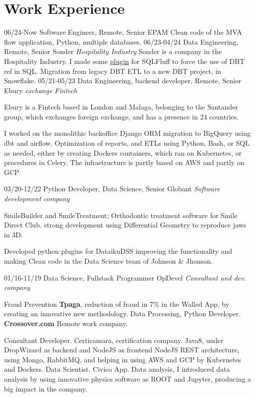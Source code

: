 \section{Work Experience}

\begin{entrylist}
  \entry
    {06/24-Now}
    {Software Engineer, Remote, Senior}
    {EPAM}
    {Clean code of the MVA flow application, Python, multiple databases.}
  \entry
    {06/23-04/24}
    {Data Engineering, Remote, Senior}
    {Sonder {\sl Hospitality Industry}}
	{Sonder is a company in the Hospitality Industry. I made some \href{http:\\https://github.com/juanfejara/sqlfluff-templ-check}{plugin} for SQLFluff to
     force the use of DBT ref in SQL. Migration from legacy DBT ETL to a new DBT project, in Snowflake.}
  \entry
    {05/21-05/23}
    {Data Engineering, backend developer, Remote, Senior}
    {Ebury {\sl exchange Fintech}}
    {Ebury is a Fintech based in London and Malaga, belonging to the Santander group, which exchanges
foreign exchange, and has a presence in 24 countries.

I worked on the monolithic backoffice Django ORM migration to BigQuery using dbt and airflow. Optimization of reports, and ETLs using Python, Bash, or SQL as needed, either by creating Dockers containers, which ran on Kubernetes, or procedures in Celery.
The infrastructure is partly based on AWS and partly on GCP.}
  \entry
    {03/20-12/22}
    {Python Developer, Data Science, Senior}
    {Globant {\sl Software development company}}
    {SmileBuilder and SmileTreatment; Orthodontic treatment software for Smile Direct Club. strong development using Differential Geometry to reproduce jaws in 3D.

Developed python plugins for DataikuDSS improving the functionality and making Clean code in the Data Science team of Johnson \& Jhonson.}

  \entry
    {01/16-11/19}
    {Data Science, Fullstack Programmer}
    {OpDevel {\sl Consultant and dev. company}}
    {Fraud Prevention \textbf{Tpaga}, reduction of fraud in 7\% in the Walled App, by creating an innovative new methodology. Data Processing, Python Developer. \textbf{Crossover.com} Remote work company.

Consultant Developer. Certicamara, certification company. Java8, under DropWizard as backend and NodeJS as frontend NodeJS REST architecture, using Mongo, RabbitMQ, and helping in using AWS and GCP by Kubernetes and Dockers. Data Scientist. Civico App. Data analysis, I introduced data analysis by using innovative physics software as ROOT and Jupyter, producing a big impact in
the company.

}
\end{entrylist}
